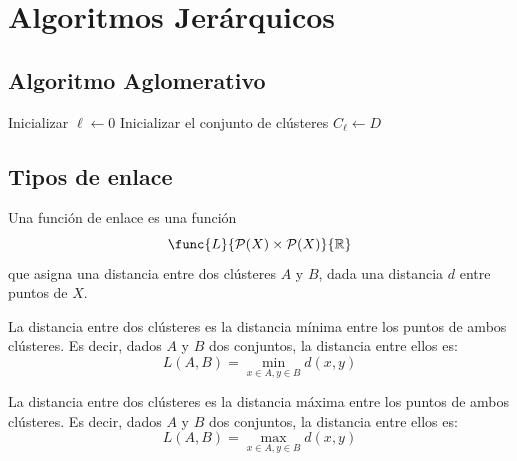 \documentclass[a4,11pt]{aleph-notas}
\begin{document}
\encabezado

\section{Algoritmos Jerárquicos}

\subsection{Algoritmo Aglomerativo}

\begin{algorithm}[H]
   
    \caption{Pseudocódigo del agrupamiento jerárquico aglomerativo (AHC)}
    
    
    Inicializar $\ell \leftarrow 0$\;
    Inicializar el conjunto de clústeres $C_\ell \leftarrow D$\;
    
    
\end{algorithm}

\subsection{Tipos de enlace}

\begin{defi}
    Una función de enlace es una función
    \[
        \func{L}{\mathcal{P}(X) \times \mathcal{P}(X)}{\mathbb{R}}
    \]
    que asigna una distancia entre dos clústeres $A$ y $B$, dada una distancia $d$ entre puntos de $X$.
\end{defi}

\begin{defi}
    La distancia entre dos clústeres es la distancia mínima entre los puntos de ambos clústeres. Es decir, dados $A$ y $B$ dos conjuntos, la distancia entre ellos es:
    \[
        L(A,B) = \min_{x \in A, y \in B} d(x,y)
    \]
\end{defi}

\begin{defi}
    La distancia entre dos clústeres es la distancia máxima entre los puntos de ambos clústeres. Es decir, dados $A$ y $B$ dos conjuntos, la distancia entre ellos es:
    \[
        L(A,B) = \max_{x \in A, y \in B} d(x,y)
    \]
\end{defi}
\end{document}
